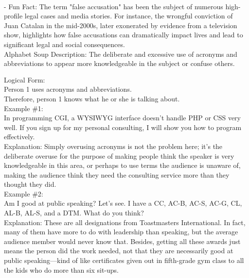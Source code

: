 \documentclass[a4paper,12pt,single,pdftex]{scrartcl}
\begin{document}
    
      
    \\

    
      - Fun Fact: The term "false accusation" has been the subject of numerous high-profile legal cases and media stories. For instance, the wrongful conviction of Juan Catalan in the mid-2000s, later exonerated by evidence from a television show, highlights how false accusations can dramatically impact lives and lead to significant legal and social consequences.
    \\

  

Alphabet Soup
    Description: The deliberate and excessive use of acronyms and abbreviations to appear more knowledgeable in the subject or confuse others.

    
      Logical Form:
    \\

    
      Person 1 uses acronyms and abbreviations.
    \\

    
      Therefore, person 1 knows what he or she is talking about.
    \\

    
      Example \#1:
    \\

    
      In programming CGI, a WYSIWYG interface doesn't handle PHP or CSS very well. If you sign up for my personal consulting, I will show you how to program effectively.
    \\

    
      Explanation: Simply overusing acronyms is not the problem here; it's the deliberate overuse for the purpose of making people think the speaker is very knowledgeable in this area, or perhaps to use terms the audience is unaware of, making the audience think they need the consulting service more than they thought they did.
    \\

    
      Example \#2:
    \\

    
      Am I good at public speaking? Let's see. I have a CC, AC-B, AC-S, AC-G, CL, AL-B, AL-S, and a DTM. What do you think?
    \\

    
      Explanation: These are all designations from Toastmasters International. In fact, many of them have more to do with leadership than speaking, but the average audience member would never know that. Besides, getting all these awards just means the person did the work needed, not that they are necessarily good at public speaking—kind of like certificates given out in fifth-grade gym class to all the kids who do more than six sit-ups.
    \\
\end{document}
